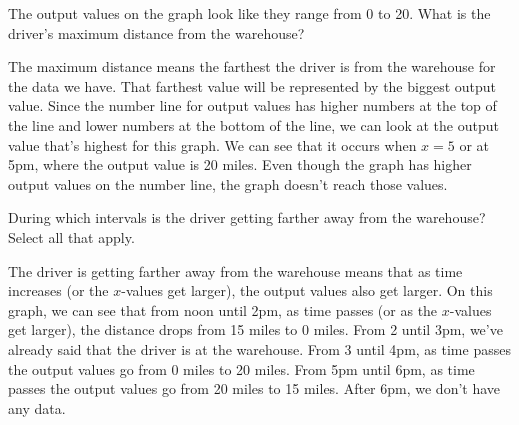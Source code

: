 \documentclass{ximera}
\begin{document}
\begin{example}
The output values on the graph look like they range from 0 to 20. What is the driver's maximum distance from the warehouse?
\begin{multipleChoice}
\begin{feedback}[correct]
The maximum distance means the farthest the driver is from the warehouse for the data we have. That farthest value will be represented by the biggest output value. Since the number line for output values has higher numbers at the top of the line and lower numbers at the bottom of the line, we can look at the output value that's highest for this graph. We can see that it occurs when $x=5$ or at 5pm, where the output value is 20 miles. Even though the graph has higher output values on the number line, the graph doesn't reach those values.
\end{feedback}
\end{multipleChoice}

During which intervals is the driver getting farther away from the warehouse? Select all that apply.
\begin{selectAll}
\begin{feedback}[attempt]
The driver is getting farther away from the warehouse means that as time increases (or the $x$-values get larger), the output values also get larger. On this graph, we can see that from noon until 2pm, as time passes (or as the $x$-values get larger), the distance drops from 15 miles to 0 miles. From 2 until 3pm, we've already said that the driver is at the warehouse. From 3 until 4pm, as time passes the output values go from 0 miles to 20 miles. From 5pm until 6pm, as time passes the output values go from 20 miles to 15 miles. After 6pm, we don't have any data.
\end{feedback}
\end{selectAll}


\end{example}
\end{document}
